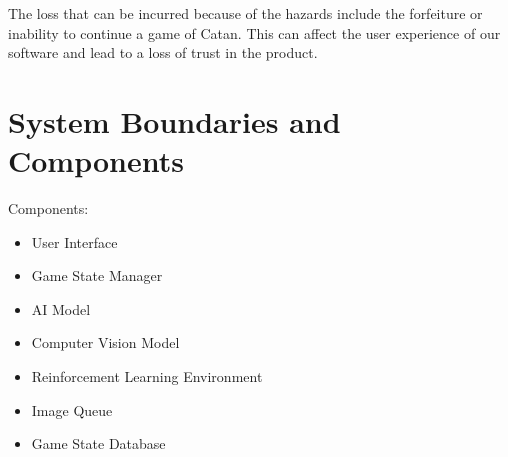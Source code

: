 \documentclass{article}
\begin{document}
The loss that can be incurred because of the hazards include the
forfeiture or inability to continue a game of Catan. This can affect the
user experience of our software and lead to a loss of trust in the product.


\section{System Boundaries and Components}\label{sec:system-boundaries-and-components}



Components: 
\begin{itemize}

\item User Interface
\item Game State Manager
\item AI Model
\item Computer Vision Model
\item Reinforcement Learning Environment
\item Image Queue
\item Game State Database

\end{itemize}
\end{document}
